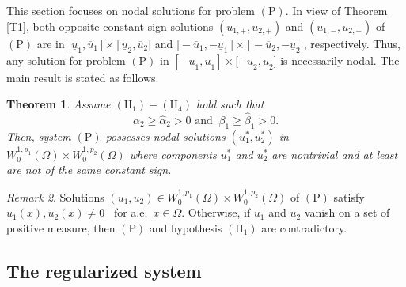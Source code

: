 \documentclass[11pt]{amsart}
\newtheorem{theorem}{Theorem}[section]
\theoremstyle{definition}
\theoremstyle{remark}
\newtheorem{remark}[theorem]{Remark}
\numberwithin{equation}{section}
\begin{document}
\label{S4}

This section focuses on nodal solutions for problem $(\mathrm{P})$. In view
of Theorem \ref{T1}, both opposite constant-sign solutions $%
(u_{1,+},u_{2,+}) $ and $(u_{1,-},u_{2,-})$ of $(\mathrm{P})$ are in $]%
\underline{u}_{1},\overline{u}_{1}[\times ]\underline{u}_{2},\overline{u}%
_{2}[$ and $]-\overline{u}_{1},-\underline{u}_{1}[\times ]-\overline{u}_{2},-%
\underline{u}_{2}[$, respectively. Thus, any solution for problem $(\mathrm{P%
})$ in $[-\underline{u}_{1},\underline{u}_{1}]\times \lbrack -\underline{u}%
_{2},\underline{u}_{2}]$ is necessarily nodal. The main result is stated as
follows.

\begin{theorem}
\label{T2}Assume $(\mathrm{H}_{1})-(\mathrm{H}_{4})$ hold such that 
\begin{equation}
\alpha _{2}\geq \hat{\alpha}_{2}>0\text{ \ and }\ \beta _{1}\geq \hat{\beta}%
_{1}>0.  \label{17}
\end{equation}%
Then, system $(\mathrm{P})$ possesses nodal solutions $(u_{1}^{\ast
},u_{2}^{\ast })$ in $W_{0}^{1,p_{1}}(\Omega )\times W_{0}^{1,p_{2}}(\Omega
) $ where components $u_{1}^{\ast }$ and $u_{2}^{\ast }$ are nontrivial and
at least are not of the same constant sign.
\end{theorem}

\begin{remark}
\label{R1}Solutions $(u_{1},u_{2})\in W_{0}^{1,p_{1}}(\Omega )\times
W_{0}^{1,p_{2}}(\Omega )$ of $(\mathrm{P})$ satisfy $u_{1}(x),u_{2}(x)\neq 0$%
\ for a.e.\ $x\in \Omega .$ Otherwise, if $u_{1}$ and $u_{2}$ vanish on a
set of positive measure, then $(\mathrm{P})$ and hypothesis $(\mathrm{H}%
_{1}) $ are contradictory.
\end{remark}

\subsection{The regularized system}
\end{document}
